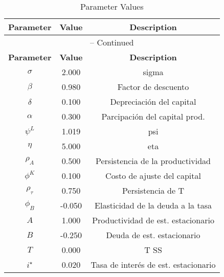 \begin{center}
\begin{longtable}{ccc}
\caption{Parameter Values}\\%
\toprule%
\multicolumn{1}{c}{\textbf{Parameter}} &
\multicolumn{1}{c}{\textbf{Value}} &
 \multicolumn{1}{c}{\textbf{Description}}\\%
\midrule%
\endfirsthead
\multicolumn{3}{c}{{\tablename} \thetable{} -- Continued}\\%
\midrule%
\multicolumn{1}{c}{\textbf{Parameter}} &
\multicolumn{1}{c}{\textbf{Value}} &
  \multicolumn{1}{c}{\textbf{Description}}\\%
\midrule%
\endhead
$\sigma$ 	 & 	 2.000 	 & 	 sigma\\
$\beta$ 	 & 	 0.980 	 & 	 Factor de descuento\\
$\delta$ 	 & 	 0.100 	 & 	 Depreciación del capital\\
$\alpha$ 	 & 	 0.300 	 & 	 Parcipación del capital prod.\\
$\psi^L$ 	 & 	 1.019 	 & 	 psi\\
$\eta$ 	 & 	 5.000 	 & 	 eta\\
$\rho_{A}$ 	 & 	 0.500 	 & 	 Persistencia de la productividad\\
$\phi^{K}$ 	 & 	 0.100 	 & 	 Costo de ajuste del capital\\
$\rho_{\tau}$ 	 & 	 0.750 	 & 	 Persistencia de T\\
$\phi_{B}$ 	 & 	 -0.050 	 & 	 Elasticidad de la deuda a la tasa\\
$A$ 	 & 	 1.000 	 & 	 Productividad de est. estacionario\\
$B$ 	 & 	 -0.250 	 & 	 Deuda de est. estacionario\\
$T$ 	 & 	 0.000 	 & 	 T SS\\
$i^{\star}$ 	 & 	 0.020 	 & 	 Tasa de interés de est. estacionario\\
\bottomrule%
\end{longtable}
\end{center}
